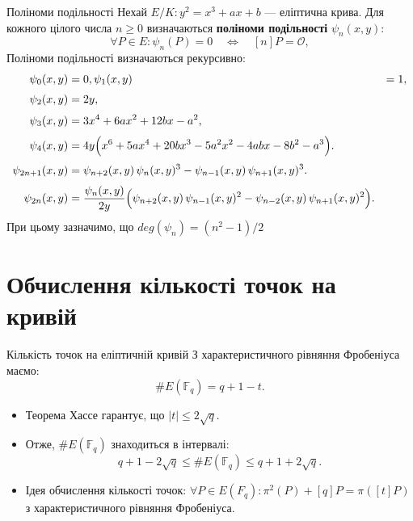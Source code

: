 \documentclass[9pt]{beamer}
\begin{document}
\begin{darkframes}
\begin{frame}{Поліноми подільності}
  Нехай \(E/K: y^2 = x^3 + ax + b\) --- еліптична крива.
  Для кожного цілого числа \(n\ge0\) визначаються \textbf{поліноми подільності} \(\psi_n(x,y)\):
  \[
  \forall P \in E: \psi_n(P)=0 \quad \Longleftrightarrow \quad [n]P = \mathcal{O},
  \]
  Поліноми подільності визначаються рекурсивно:
  $$\begin{aligned}
  \psi_0(x,y) &= 0, \psi_1(x,y) &= 1,\\[1mm]
  \psi_2(x,y) &= 2y,\\[1mm]
  \psi_3(x,y) &= 3x^4 + 6ax^2 + 12bx - a^2,\\[1mm]
  \psi_4(x,y) &= 4y\Bigl(x^6+5ax^4+20bx^3-5a^2x^2-4abx-8b^2-a^3\Bigr).\\[1mm]
  \psi_{2n+1}(x,y)&= \psi_{n+2}(x,y)\,\psi_n(x,y)^3 - \psi_{n-1}(x,y)\,\psi_{n+1}(x,y)^3.\\[1mm]
  \psi_{2n}(x,y)&= \frac{\psi_n(x,y)}{2y}\Bigl(
  \psi_{n+2}(x,y)\,\psi_{n-1}(x,y)^2 - \psi_{n-2}(x,y)\,\psi_{n+1}(x,y)^2\Bigr).
  \end{aligned}$$
  При цьому зазначимо, що $deg(\psi_n) = (n^2-1)/2$
\end{frame}


\section{Обчислення кількості точок на кривій}
\begin{frame}{Кількість точок на еліптичній кривій}
  З характеристичного рівняння Фробеніуса маємо:
  \[
  \#E(\mathbb{F}_q) = q + 1 - t.
  \]
  \vspace{0.3cm}
  \begin{itemize}
    \item Теорема Хассе гарантує, що \(|t| \le 2\sqrt{q}\).
    \item Отже, \(\#E(\mathbb{F}_q)\) знаходиться в інтервалі:
      \[
      q + 1 - 2\sqrt{q} \le \#E(\mathbb{F}_q) \le q + 1 + 2\sqrt{q}.
      \]
    \item Ідея обчислення кількості точок: $\forall P\in E(F_q): \pi^2(P)+[q]P = \pi([t]P)$ з характеристичного рівняння Фробеніуса.
  \end{itemize}
  
\end{frame}


\end{darkframes}
\end{document}
